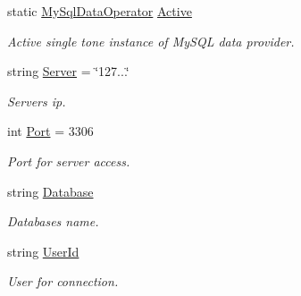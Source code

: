 \begin{DoxyCompactItemize}
\item 
static \mbox{\hyperlink{class_uniform_data_operator_1_1_sql_1_1_my_sql_1_1_my_sql_data_operator}{My\+Sql\+Data\+Operator}} \mbox{\hyperlink{class_uniform_data_operator_1_1_sql_1_1_my_sql_1_1_my_sql_data_operator_a8e8f8f936f6a4306dc4dc0d3eb07770c}{Active}}
\begin{DoxyCompactList}\small\item\em Active single tone instance of My\+S\+QL data provider. \end{DoxyCompactList}\item 
string \mbox{\hyperlink{class_uniform_data_operator_1_1_sql_1_1_my_sql_1_1_my_sql_data_operator_a2154fef9e522ef26cf08642483fed223}{Server}} = \char`\"{}127...\char`\"{}
\begin{DoxyCompactList}\small\item\em Server\textquotesingle{}s ip. \end{DoxyCompactList}\item 
int \mbox{\hyperlink{class_uniform_data_operator_1_1_sql_1_1_my_sql_1_1_my_sql_data_operator_a2cfc65d2842491734270dfe114d9eec5}{Port}} = 3306
\begin{DoxyCompactList}\small\item\em Port for server access. \end{DoxyCompactList}\item 
string \mbox{\hyperlink{class_uniform_data_operator_1_1_sql_1_1_my_sql_1_1_my_sql_data_operator_a144616e12acb2b55c7046af0c9af989d}{Database}}
\begin{DoxyCompactList}\small\item\em Database\textquotesingle{}s name. \end{DoxyCompactList}\item 
string \mbox{\hyperlink{class_uniform_data_operator_1_1_sql_1_1_my_sql_1_1_my_sql_data_operator_ae5e119508a6d9807b9e138c628a6e18f}{User\+Id}}
\begin{DoxyCompactList}\small\item\em User for connection. \end{DoxyCompactList}\item 

\end{DoxyCompactItemize}
